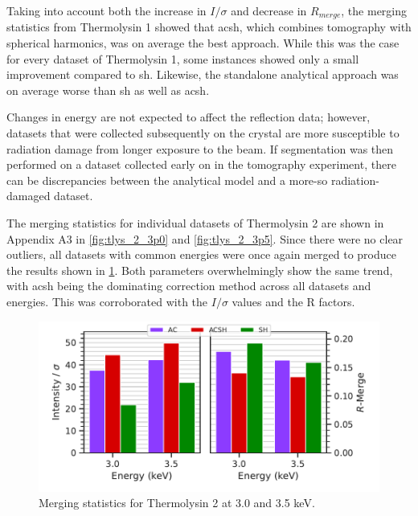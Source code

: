 Taking into account both the increase in $I/\sigma$ and decrease in $R_{merge}$, the merging statistics from Thermolysin 1 showed that \ac{acsh}, which combines tomography with spherical harmonics, was on average the best approach. While this was the case for every dataset of Thermolysin 1, some instances showed only a small improvement compared to \ac{sh}. Likewise, the standalone analytical approach was on average worse than \ac{sh} as well as \ac{acsh}.

Changes in energy are not expected to affect the reflection data; however, datasets that were collected subsequently on the crystal are more susceptible to radiation damage from longer exposure to the beam. If segmentation was then performed on a dataset collected early on in the tomography experiment, there can be discrepancies between the analytical model and a more-so radiation-damaged dataset.


The merging statistics for individual datasets of Thermolysin 2 are shown in Appendix A3 in \cref{fig:tlys_2_3p0} and \cref{fig:tlys_2_3p5}. Since there were no clear outliers, all datasets with common energies were once again merged to produce the results shown in \cref{fig:tlys_2_stats}. Both parameters overwhelmingly show the same trend, with \ac{acsh} being the dominating correction method across all datasets and energies. This was corroborated with the $I/\sigma$ values and the R factors.

\begin{figure}
    \centering
    \includegraphics{plots/exp1/tlys_2_P6122/merged_stats.pdf}
    \caption{Merging statistics for Thermolysin 2 at 3.0 and 3.5 \unit{keV}.}
    \label{fig:tlys_2_stats}
\end{figure}

